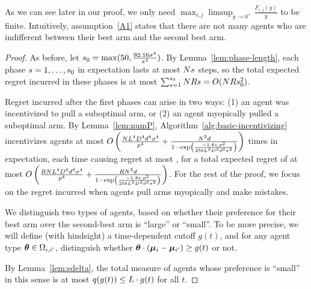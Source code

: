 As we can see later in our proof, we only need $\max_{i,j}\limsup_{y\rightarrow 0^{+}}\frac{F_{i,j}(y)}{y}$ to be finite. Intuitively, assumption~\ref{A1} states that there are not many agents who are indifferent between their best arm and the second best arm. 


\begin{proof}
As before, let $s_0 = \max (50, \frac{92.16 \sigma^4}{x^4})$.
By Lemma~\ref{lem:phase-length}, each phase $s = 1, \ldots, s_0$
in expectation lasts at most $N s$ steps,
so the total expected regret incurred in these phases is at most
$\sum_{s=1}^{s_0} N R s = O(N R s_0^2)$.

Regret incurred after the first \LatePhase phases can arise in two ways:
(1) an agent was incentivized to pull a suboptimal arm, or
(2) an agent myopically pulled a suboptimal arm.
By Lemma~\ref{lem:numP}, Algorithm~\ref{alg:basic-incentivizing}
incentivizes agents at most 
$O \left( \frac{N L^4 D^4 d^4 \sigma^4}{p^4}
  + \frac{N^2 d}{1 - \exp \left(
    \frac{-1.8 s \cdot p^2}{256 L^2 D^2 d^2 \sigma^2}
  \right)} \right)$
times in expectation, each time causing regret at most \MAXR,
for a total expected regret of at most
$O \left( \frac{R N L^4 D^4 d^4 \sigma^4}{p^4}
  + \frac{R N^2 d}{1 - \exp \left(
    \frac{-1.8 s \cdot p^2}{256 L^2 D^2 d^2 \sigma^2}
  \right)} \right)$.
For the rest of the proof, we focus on the regret incurred when agents
pull arms myopically and make mistakes.

We distinguish two types of agents, based on whether their preference
for their best arm over the second-best arm is ``large'' or ``small''.
To be more precise, we will define (with hindsight) a time-dependent
cutoff $g(t)$, and for any agent type $\bm{\theta} \in \Omega_{i,i'}$,
distinguish whether $\bm{\theta} \cdot (\bm{\mu}_{i} - \bm{\mu}_{i'}) \geq g(t)$ or not.

By Lemma~\ref{lem:sdelta}, the total measure of agents whose
preference is ``small'' in this sense is at most
$q(g(t)) \leq L \cdot g(t)$ for all $t$.



\end{proof}
